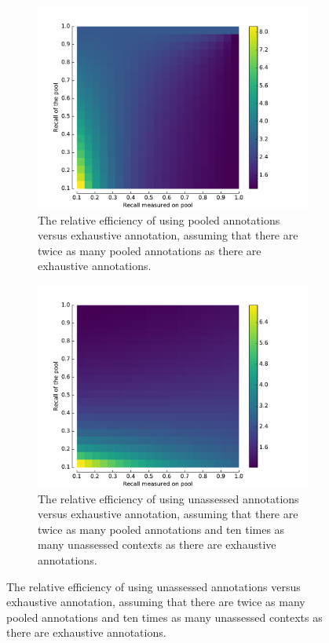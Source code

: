 \begin{figure}
  \begin{subfigure}{0.49\textwidth}
    \includegraphics[width=\textwidth]{figures/variance-ratio-pool}
    \caption{\label{fig:pool-for-corpus} The relative efficiency of using pooled annotations versus exhaustive annotation, assuming that there are twice as many pooled annotations as there are exhaustive annotations.}
  \end{subfigure}
  \hfill
  \begin{subfigure}{0.49\textwidth}
    \includegraphics[width=\textwidth]{figures/variance-ratio-unassessed}
    \caption{\label{fig:pool-for-unassessed} The relative efficiency of using unassessed annotations versus exhaustive annotation, assuming that there are twice as many pooled annotations and ten times as many unassessed contexts as there are exhaustive annotations.}
  \end{subfigure}
\end{figure}

